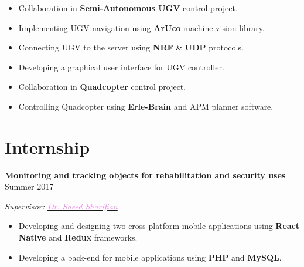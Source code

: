 \documentclass[11pt,a4paper,roman]{moderncv} %
\begin{document}
\begin{itemize}
\begin{adjustwidth}{0.2in}{0in}
		\begin{itemize}
			\item Collaboration in \textbf{Semi-Autonomous UGV} control project.
			\item Implementing UGV navigation using \textbf{ArUco} machine vision library.
			\item Connecting UGV to the server using \textbf{NRF} \& \textbf{UDP} protocols.
			\item Developing a graphical user interface for UGV controller.
			\item Collaboration in \textbf{Quadcopter} control project.
			\item Controlling Quadcopter using \textbf{Erle-Brain} and APM planner software.
		\end{itemize}
	\end{adjustwidth}
\end{itemize}

\section{Internship}

\textbf{Monitoring and tracking objects for rehabilitation and security uses} \hfill Summer 2017

\emph{Supervisor: \href{http://ele.aut.ac.ir/~sharifian}{\textcolor{violet}{Dr. Saeed Sharifian}}}

\begin{adjustwidth}{0.2in}{0in}
	\begin{itemize}
		\item Developing and designing two cross-platform mobile applications using \textbf{React Native} and \textbf{Redux} frameworks.
		\item Developing a back-end for mobile applications using \textbf{PHP} and \textbf{MySQL}.
	\end{itemize}
\end{adjustwidth}

\end{document}
